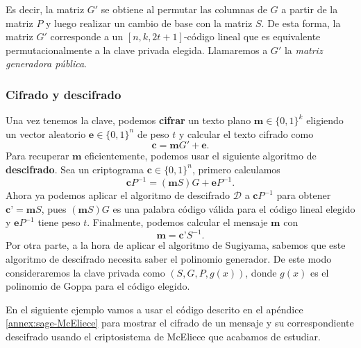 Es decir, la matriz $G'$ se obtiene al permutar las columnas de $G$ a partir de la matriz $P$ y luego realizar un cambio de base con la matriz $S$. De esta forma, la matriz $G'$ corresponde a un $[n, k, 2t + 1]$-código lineal que es equivalente permutacionalmente a la clave privada elegida. Llamaremos a $G'$ la \emph{matriz generadora pública}.

\subsubsection{Cifrado y descifrado}

Una vez tenemos la clave, podemos \textbf{cifrar} un texto plano $\textbf{m} \in \{ 0, 1 \}^k$ eligiendo un vector aleatorio $\textbf{e} \in \{ 0, 1 \}^n$ de peso $t$ y calcular el texto cifrado como
\[
    \textbf{c} = \textbf{m} G' + \textbf{e}.
\]
Para recuperar $\textbf{m}$ eficientemente, podemos usar el siguiente algoritmo de \textbf{descifrado}. Sea un criptograma $\textbf{c} \in \{ 0, 1 \}^n$, primero calculamos
\[
    \textbf{c} P^{-1} = (\textbf{m} S) G + \textbf{e} P^{-1}.
\]
Ahora ya podemos aplicar el algoritmo de descifrado $\mathcal{D}$ a $\textbf{c} P^{-1}$ para obtener $\textbf{c'} = \textbf{m} S$, pues $(\textbf{m} S) G$ es una palabra código válida para el código lineal elegido y $\textbf{e} P^{-1}$ tiene peso $t$. Finalmente, podemos calcular el mensaje $\textbf{m}$ con
\[
    \textbf{m} = \textbf{c'} S^{-1}.
\]
Por otra parte, a la hora de aplicar el algoritmo de Sugiyama, sabemos que este algoritmo de descifrado necesita saber el polinomio generador. De este modo consideraremos la clave privada como $(S, G, P, g(x))$, donde $g(x)$ es el polinomio de Goppa para el código elegido.

En el siguiente ejemplo vamos a usar el código descrito en el apéndice \ref{annex:sage-McEliece} para mostrar el cifrado de un mensaje y su correspondiente descifrado usando el criptosistema de McEliece que acabamos de estudiar.

